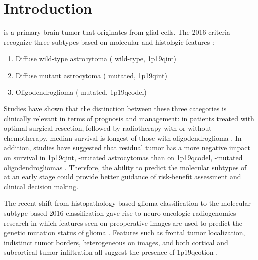 \section{Introduction}

 is a primary brain tumor that originates from glial cells.
The  2016 criteria recognize three subtypes based on molecular and histologic features \autocite{louis20162016,van2017diffuse}:

\begin{enumerate}
\item Diffuse  wild-type astrocytoma ( wild-type, \acl{1p19qint})
\item Diffuse  mutant astrocytoma ( mutated, \acl{1p19qint})
\item Oligodendroglioma ( mutated, \acl{1p19qcodel})
\end{enumerate}

Studies have shown that the distinction between these three categories is clinically relevant in terms of prognosis and management: in patients treated with optimal surgical resection, followed by radiotherapy with or without chemotherapy, median survival is longest of those with oligodendroglioma \autocite{cairncross2014benefit, dubbink2015molecular}.
In addition, studies have suggested that residual tumor has a more negative impact on survival in \acl{1p19qint}, -mutated astrocytomas than on \acl{1p19qcodel}, -mutated oligodendrogliomas \autocite{wijnenga2017impact, clark2019extent}.
Therefore, the ability to predict the molecular subtypes of  at an early stage could provide better guidance of risk-benefit assessment and clinical decision making.

The recent shift from histopathology-based glioma classification to the molecular subtype-based  2016 classification gave rise to neuro-oncologic radiogenomics research in which features seen on preoperative  images are used to predict the genetic mutation status of glioma \autocite{smits2017imaging, gevaert2014glioblastoma, gutman2013mr}.
Features such as frontal tumor localization, indistinct tumor borders, heterogeneous  on  images, and both cortical and subcortical tumor infiltration all suggest the presence of \acl{1p19qcotion} \autocite{smits2017imaging}.

